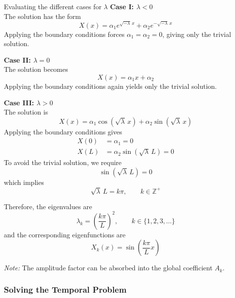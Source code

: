 \begin{defbox}{Evaluating the different cases for $\lambda$}
\textbf{Case I: $\lambda<0$} \\
The solution has the form
\begin{equation*}
    X(x)=\alpha_1 e^{\sqrt{-\lambda}\,x}+\alpha_2 e^{-\sqrt{-\lambda}\,x}
\end{equation*}
Applying the boundary conditions forces $\alpha_1=\alpha_2=0$, giving only the trivial solution.

\vspace{0.2cm}
\textbf{Case II: $\lambda=0$} \\
The solution becomes
\begin{equation*}
    X(x)=\alpha_1 x+\alpha_2
\end{equation*}
Applying the boundary conditions again yields only the trivial solution.

\vspace{0.2cm}
\textbf{Case III: $\lambda>0$} \\
The solution is
\begin{equation*}
    X(x)=\alpha_1 \cos(\sqrt{\lambda}\,x)+\alpha_2 \sin(\sqrt{\lambda}\,x)
\end{equation*}
Applying the boundary conditions gives
\begin{align*}
    X(0) &= \alpha_1 = 0 \\
    X(L) &= \alpha_2 \sin(\sqrt{\lambda}\,L)=0
\end{align*}
To avoid the trivial solution, we require
\begin{equation*}
    \sin(\sqrt{\lambda}\,L)=0
\end{equation*}
which implies
\begin{equation*}
    \sqrt{\lambda}\,L = k\pi,
    \qquad k\in\mathbb{Z}^{+}
\end{equation*}
\end{defbox}

Therefore, the eigenvalues are
\begin{equation}
    \lambda_k=\left(\frac{k\pi}{L}\right)^2,
    \qquad k\in\{1,2,3,\dots\}
\end{equation}
and the corresponding eigenfunctions are
\begin{equation}
    X_k(x)=\sin\left(\frac{k\pi}{L}x\right)
\end{equation}

\textit{Note:} The amplitude factor can be absorbed into the global coefficient $A_k$.

\subsubsection{Solving the Temporal Problem}

